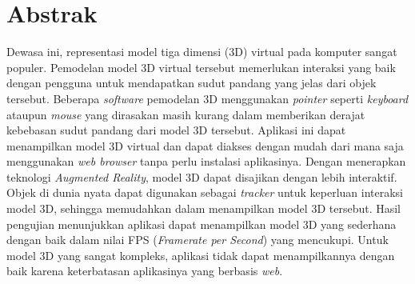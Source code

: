 \documentclass[12pt,a4paper,pdftex,final,oneside,titlepage]{book}
\begin{document}

\chapter*{\centering Abstrak}
\thispagestyle{empty}
Dewasa ini, representasi model tiga dimensi (3D) virtual pada komputer sangat populer. Pemodelan model 3D virtual tersebut memerlukan interaksi yang baik dengan pengguna untuk mendapatkan sudut pandang yang jelas dari objek tersebut. Beberapa \textit{software} pemodelan 3D menggunakan \textit{pointer} seperti \textit{keyboard} ataupun \textit{mouse} yang dirasakan masih kurang dalam memberikan derajat kebebasan sudut pandang dari model 3D tersebut. Aplikasi ini dapat menampilkan model 3D virtual dan dapat diakses dengan mudah dari mana saja menggunakan \textit{web browser} tanpa perlu instalasi aplikasinya. Dengan menerapkan teknologi \textit{Augmented Reality}, model 3D dapat disajikan dengan lebih interaktif. Objek di dunia nyata dapat digunakan sebagai \textit{tracker} untuk keperluan interaksi model 3D, sehingga memudahkan dalam menampilkan model 3D tersebut. Hasil pengujian menunjukkan aplikasi dapat menampilkan model 3D yang sederhana dengan baik dalam nilai FPS (\textit{Framerate per Second}) yang mencukupi. Untuk model 3D yang sangat kompleks, aplikasi tidak dapat menampilkannya dengan baik karena keterbatasan aplikasinya yang berbasis \textit{web}.


\vspace*{2cm}
\end{document}
